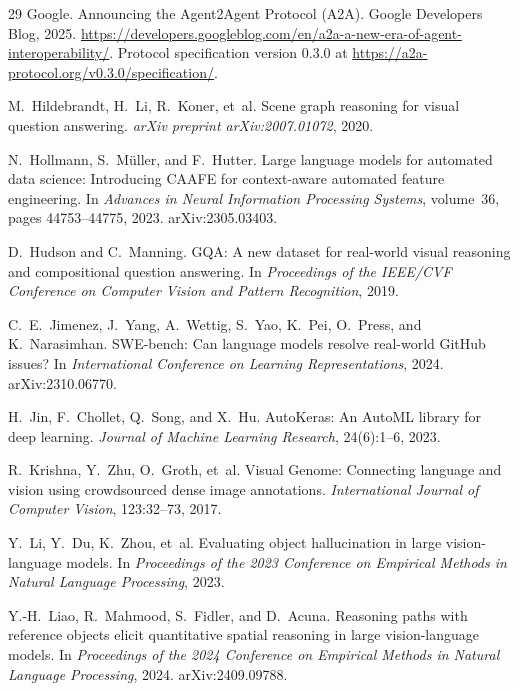\documentclass{article}
\begin{document}
\begin{thebibliography}{29}
Google. Announcing the Agent2Agent Protocol (A2A). Google Developers Blog, 2025. \url{https://developers.googleblog.com/en/a2a-a-new-era-of-agent-interoperability/}. Protocol specification version 0.3.0 at \url{https://a2a-protocol.org/v0.3.0/specification/}.

M.~Hildebrandt, H.~Li, R.~Koner, et~al. Scene graph reasoning for visual question answering. \emph{arXiv preprint arXiv:2007.01072}, 2020.

N.~Hollmann, S.~M{\"u}ller, and F.~Hutter. Large language models for automated data science: Introducing CAAFE for context-aware automated feature engineering. In \emph{Advances in Neural Information Processing Systems}, volume~36, pages 44753--44775, 2023. arXiv:2305.03403.

D.~Hudson and C.~Manning. GQA: A new dataset for real-world visual reasoning and compositional question answering. In \emph{Proceedings of the IEEE/CVF Conference on Computer Vision and Pattern Recognition}, 2019.

C.~E.~Jimenez, J.~Yang, A.~Wettig, S.~Yao, K.~Pei, O.~Press, and K.~Narasimhan. SWE-bench: Can language models resolve real-world GitHub issues? In \emph{International Conference on Learning Representations}, 2024. arXiv:2310.06770.

H.~Jin, F.~Chollet, Q.~Song, and X.~Hu. AutoKeras: An AutoML library for deep learning. \emph{Journal of Machine Learning Research}, 24(6):1--6, 2023.

R.~Krishna, Y.~Zhu, O.~Groth, et~al. Visual Genome: Connecting language and vision using crowdsourced dense image annotations. \emph{International Journal of Computer Vision}, 123:32--73, 2017.

Y.~Li, Y.~Du, K.~Zhou, et~al. Evaluating object hallucination in large vision-language models. In \emph{Proceedings of the 2023 Conference on Empirical Methods in Natural Language Processing}, 2023.

Y.-H.~Liao, R.~Mahmood, S.~Fidler, and D.~Acuna. Reasoning paths with reference objects elicit quantitative spatial reasoning in large vision-language models. In \emph{Proceedings of the 2024 Conference on Empirical Methods in Natural Language Processing}, 2024. arXiv:2409.09788.


\end{thebibliography}
\end{document}
